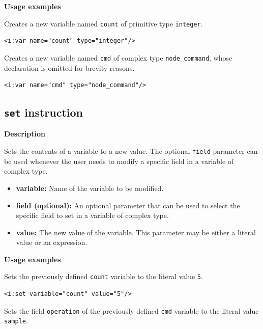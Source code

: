 \textbf{Usage examples}

Creates a new variable named \texttt{count} of primitive type \texttt{integer}.

\lstset{language=XML}
\begin{lstlisting}
<i:var name="count" type="integer"/>
\end{lstlisting}

Creates a new variable named \texttt{cmd} of complex type
\texttt{node\_command}, whose declaration is omitted for brevity reasons.

\lstset{language=XML}
\begin{lstlisting}
<i:var name="cmd" type="node_command"/>
\end{lstlisting}

\subsection{\texttt{set} instruction}

\textbf{Description}

Sets the contents of a variable to a new value. The optional \texttt{field}
parameter can be used whenever the user needs to modify a specific field in a
variable of complex type.

\begin{itemize}

    \item \textbf{variable:} Name of the variable to be modified.

    \item \textbf{field (optional):} An optional parameter that can be used to
        select the specific field to set in a variable of complex type.

    \item \textbf{value:} The new value of the variable. This parameter may
        be either a literal value or an expression.

\end{itemize}

\textbf{Usage examples}

Sets the previously defined \texttt{count} variable to the literal value \texttt{5}.

\lstset{language=XML}
\begin{lstlisting}
<i:set variable="count" value="5"/>
\end{lstlisting}

Sets the field \texttt{operation} of the previously defined \texttt{cmd}
variable to the literal value \texttt{sample}.

